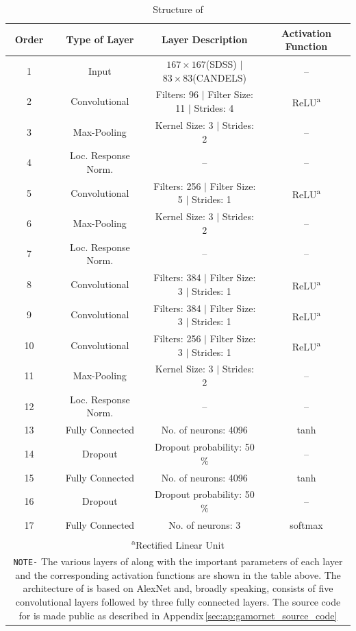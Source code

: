 \begin{table}
  \centering
  \caption{Structure of \gamornet{} \label{tab:network_layers}}
  \begin{tabular}{cccc}
  \hline
  \hline
  Order & Type of Layer & Layer Description & Activation Function \\
  \hline
  1 & Input & $167\times167$(SDSS) $\vert$ $83\times83$(CANDELS) & --  \\
  \hline
  2 & Convolutional & Filters: 96 $\vert$ Filter Size: 11 $\vert$ Strides: 4 & ReLU\textsuperscript{a} \\
  \hline   
  3 & Max-Pooling & Kernel Size: 3 $\vert$ Strides: 2 & -- \\
  \hline
  4 & Loc. Response Norm. & -- & -- \\
  \hline
  5 & Convolutional & Filters: 256 $\vert$ Filter Size: 5 $\vert$ Strides: 1 & ReLU\textsuperscript{a} \\
  \hline   
  6 & Max-Pooling & Kernel Size: 3 $\vert$ Strides: 2 & -- \\
  \hline
  7 & Loc. Response Norm. & -- & -- \\
  \hline
  8 & Convolutional & Filters: 384 $\vert$ Filter Size: 3 $\vert$ Strides: 1 & ReLU\textsuperscript{a} \\
  \hline
  9 & Convolutional & Filters: 384 $\vert$ Filter Size: 3 $\vert$ Strides: 1 & ReLU\textsuperscript{a} \\
  \hline
  10 & Convolutional & Filters: 256 $\vert$ Filter Size: 3 $\vert$ Strides: 1 & ReLU\textsuperscript{a} \\
  \hline
  11 & Max-Pooling & Kernel Size: 3 $\vert$ Strides: 2 & -- \\
  \hline
  12 & Loc. Response Norm. & -- & -- \\
  \hline
  13 & Fully Connected & No. of neurons: 4096 & tanh \\
  \hline
  14 & Dropout & Dropout probability: 50$\%$ & -- \\
  \hline
  15 & Fully Connected & No. of neurons: 4096 & tanh \\
  \hline
  16 & Dropout & Dropout probability: 50$\%$ & -- \\
  \hline
  17 & Fully Connected & No. of neurons: 3 & softmax \\
  \hline
  \multicolumn{4}{p{0.93\textwidth}}{\vskip 0.1cm \small \textsuperscript{a}Rectified Linear Unit} \\
  \multicolumn{4}{p{0.93\textwidth}}{\small \texttt{NOTE-} The various layers of \gamornet{} along with the important parameters of each layer and the corresponding activation functions are shown in the table above. The architecture of \gamornet{} is based on AlexNet and, broadly speaking, consists of five convolutional layers followed by three fully connected layers. The source code for \gamornet{} is made public as described in Appendix\,\ref{sec:ap:gamornet_source_code}} \\
  \end{tabular}
\end{table}

